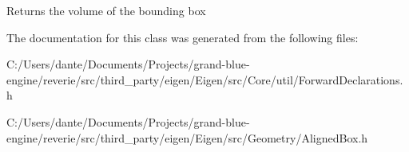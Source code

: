 \begin{DoxyReturn}{Returns}
the volume of the bounding box 
\end{DoxyReturn}


The documentation for this class was generated from the following files\+:\begin{DoxyCompactItemize}
\item 
C\+:/\+Users/dante/\+Documents/\+Projects/grand-\/blue-\/engine/reverie/src/third\+\_\+party/eigen/\+Eigen/src/\+Core/util/Forward\+Declarations.\+h\item 
C\+:/\+Users/dante/\+Documents/\+Projects/grand-\/blue-\/engine/reverie/src/third\+\_\+party/eigen/\+Eigen/src/\+Geometry/Aligned\+Box.\+h\end{DoxyCompactItemize}
